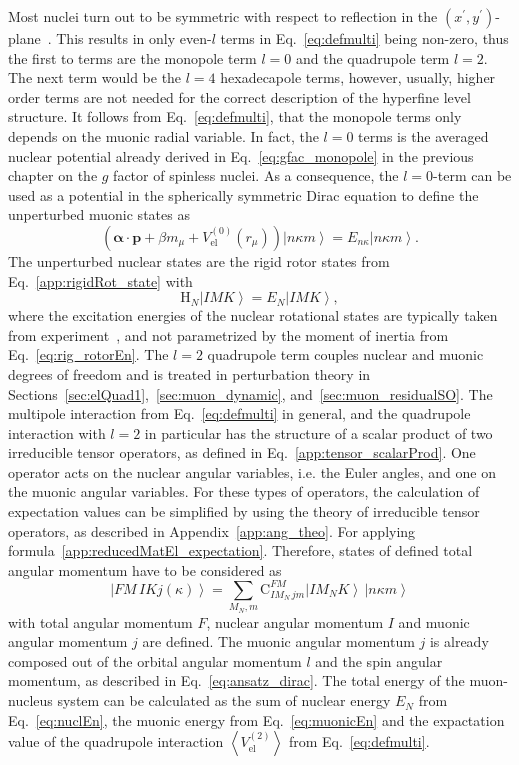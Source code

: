 Most nuclei turn out to be symmetric with respect to reflection in the $(x^\prime ,y^\prime)$-plane~\cite{zickendraht1991}. This results in only even-$l$ terms in Eq.~\eqref{eq:defmulti} being non-zero, thus the first to terms are the monopole term $l=0$ and the quadrupole term $l=2$. The next term would be the $l=4$ hexadecapole terms, however, usually, higher order terms are not needed for the correct description of the hyperfine level structure. It follows from Eq.~\eqref{eq:defmulti}, that the monopole terms only depends on the muonic radial variable. In fact, the $l=0$ terms is the averaged nuclear potential already derived in Eq.~\eqref{eq:gfac_monopole} in the previous chapter on the $g$ factor of spinless nuclei. As a consequence, the $l=0$-term can be used as a potential in the spherically symmetric Dirac equation to define the unperturbed muonic states as
\begin{equation}
\label{eq:muonicEn}
\left(\boldsymbol{\alpha} \cdot \mathbf{p} + \beta m_\mu + V_{\text{el}}^{(0)}(r_\mu) \right) \left|n\kappa m\right> = E_{n\kappa}\left|n\kappa m\right>.
\end{equation}
The unperturbed nuclear states are the rigid rotor states from Eq.~\eqref{app:rigidRot_state} with
\begin{equation}
\label{eq:nuclEn}
\text{H}_N \left|IMK\right> = E_N \left|IMK\right>,
\end{equation}
where the excitation energies of the nuclear rotational states are typically taken from experiment~\cite{ENSDF}, and not parametrized by the moment of inertia from Eq.~\eqref{eq:rig_rotorEn}.
The $l=2$ quadrupole term couples nuclear and muonic degrees of freedom and is treated in perturbation theory in Sections~\ref{sec:elQuad1},~\ref{sec:muon_dynamic}, and~\ref{sec:muon_residualSO}. The multipole interaction from Eq.~\eqref{eq:defmulti} in general, and the quadrupole interaction with $l=2$ in particular has the structure of a scalar product of two irreducible tensor operators, as defined in Eq.~\eqref{app:tensor_scalarProd}. One operator acts on the nuclear angular variables, i.e. the Euler angles, and one on the muonic angular variables.
For these types of operators, the calculation of expectation values can be simplified by using the theory of irreducible tensor operators, as described in Appendix~\ref{app:ang_theo}. For applying formula~\eqref{app:reducedMatEl_expectation}. Therefore, states of defined total angular momentum have to be considered as
\begin{equation}
\label{eq:totalState}
\left| FM\,IKj(\kappa)\right> = \sum_{M_N, m}\text{C}^{FM}_{IM_N\,jm}\left|IM_NK\right>\,\left|n\kappa m\right>
\end{equation}
with total angular momentum $F$, nuclear angular momentum $I$ and muonic angular momentum $j$ are defined. The muonic angular momentum $j$ is already composed out of the orbital angular momentum $l$ and the spin angular momentum, as described in Eq.~\eqref{eq:ansatz_dirac}. The total energy of the muon-nucleus system can be calculated as the sum of nuclear energy $E_N$ from Eq.~\eqref{eq:nuclEn}, the muonic energy from Eq.~\eqref{eq:muonicEn} and the expactation value of the quadrupole interaction $\left<V_{\text{el}}^{(2)}\right>$ from Eq.~\eqref{eq:defmulti}.

